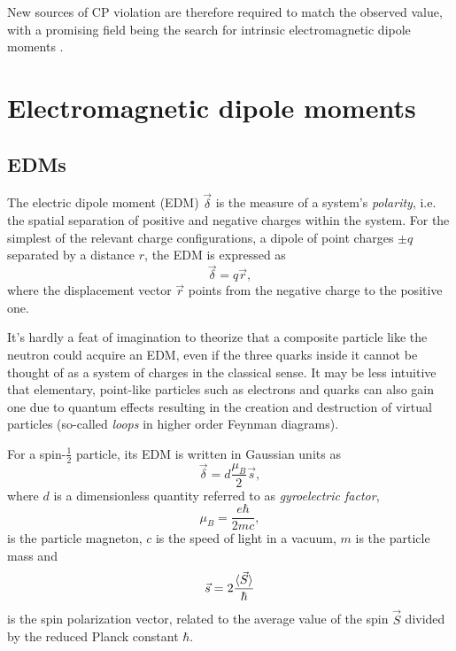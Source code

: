 New sources of CP violation are therefore required to match the observed value, with a promising field being the search for intrinsic electromagnetic dipole moments \cite{cpvws}.

\section{Electromagnetic dipole moments}
\label{sec:emdms}

\subsection{EDMs}
The electric dipole moment (EDM) $\vec{\delta}$ is the measure of a system's \textit{polarity}, i.e. the spatial separation of positive and negative charges within the system.
For the simplest of the relevant charge configurations, a dipole of point charges $\pm q$ separated by a distance $r$, the EDM is expressed as
\begin{equation}
	\vec{\delta} = q \vec{r},
\end{equation}
where the displacement vector $\vec{r}$ points from the negative charge to the positive one.

It's hardly a feat of imagination to theorize that a composite particle like the neutron could acquire an EDM, even if the three quarks inside it cannot be thought of as a system of charges in the classical sense.
It may be less intuitive that elementary, point-like particles such as electrons and quarks can also gain one due to quantum effects resulting in the creation and destruction of virtual particles (so-called \textit{loops} in higher order Feynman diagrams).

For a spin-$\frac{1}{2}$ particle, its EDM is written in Gaussian units as \cite{searchNewPhysics}
\begin{equation}
\vec{\delta} = d \frac{\mu_B}{2} \vec{s},
\end{equation}
where $d$ is a dimensionless quantity referred to as \textit{gyroelectric factor},
\begin{equation}
\mu_B = \frac{e\hbar}{2mc},
\label{eq:magneton}
\end{equation}
is the particle magneton, $c$ is the speed of light in a vacuum, $m$ is the particle mass and
\begin{equation}
\vec{s} = 2 \frac{\braket{\vec{S}}}{\hbar}
\label{eq:spin-polarization-vector}
\end{equation}
is the spin polarization vector, related to the average value of the spin $\vec{S}$ divided by the reduced Planck constant $\hbar$.

